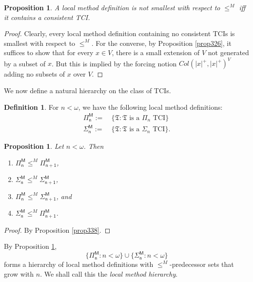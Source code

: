 \documentclass[12pt, twoside]{memoir}
\numberwithin{equation}{section}
\newtheorem{prop}[thm]{Proposition}
\theoremstyle{definition}
\newtheorem{defi}[thm]{Definition}
\theoremstyle{remark}
\theoremstyle{definition}
\theoremstyle{definition}
\theoremstyle{definition}
\theoremstyle{remark}
\begin{document}
\begin{prop}
A local method definition is not smallest with respect to $\leq^M$ iff it contains a consistent TCI.
\end{prop}

\begin{proof}
Clearly, every local method definition containing no consistent TCIs is smallest with respect to $\leq^M$. For the converse, by Proposition \ref{prop326}, it suffices to show that for every $x \in V$, there is a small extension of $V$ not generated by a subset of $x$. But this is implied by the forcing notion $Col(|x|^+, |x|^+)^V$ adding no subsets of $x$ over $V$.
\end{proof}

We now define a natural hierarchy on the class of TCIs.

\begin{defi}\label{def339}
For $n < \omega$, we have the following local method definitions:
\begin{align*}
    \mathsf{\Pi^M_n} := \ & \{\mathfrak{T} : \mathfrak{T} \text{ is a } \Pi_n \text{ TCI}\}
    \\
    \mathsf{\Sigma^M_n} := \ & \{\mathfrak{T} : \mathfrak{T} \text{ is a } \Sigma_n \text{ TCI}\} \text{.}
\end{align*}
\end{defi}

\begin{prop}\label{prop340}
Let $n < \omega$. Then
\begin{enumerate}[label=(\arabic*)]
    \item $\mathsf{\Pi^M_n} \leq^M \mathsf{\Pi^M_{n+1}}$,
    \item $\mathsf{\Sigma^M_n} \leq^M \mathsf{\Sigma^M_{n+1}}$,
    \item $\mathsf{\Pi^M_n} \leq^M \mathsf{\Sigma^M_{n+1}}$, and
    \item $\mathsf{\Sigma^M_n} \leq^M \mathsf{\Pi^M_{n+1}}$.
\end{enumerate}
\end{prop}

\begin{proof}
By Proposition \ref{prop338}.
\end{proof}

By Proposition \ref{prop340}, 
\begin{equation*}
    \{\mathsf{\Pi^M_n} : n < \omega\} \cup \{\mathsf{\Sigma^M_n} : n < \omega\}
\end{equation*}
forms a hierarchy of local method definitions with $\leq^M$-predecessor sets that grow with $n$. We shall call this the \emph{local method hierarchy}.
\end{document}
